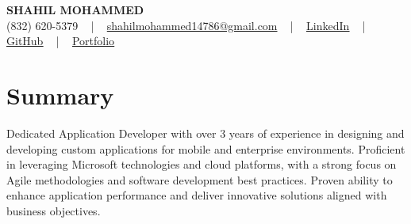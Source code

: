\documentclass[letterpaper,10pt]{article}
\begin{document}
\begin{center}
    {\fontsize{14pt}{12pt}\selectfont \textbf{\MakeUppercase{Shahil Mohammed}}}\\ \vspace{2pt}
    \fontsize{10pt}{12pt}\selectfont (832) 620-5379 ~ | ~ \href{mailto:shahilmohammed14786@gmail.com}{shahilmohammed14786@gmail.com} ~ | ~  
    \href{https://www.linkedin.com/in/shahil-mohammed-9652931a1/}{\color{blue}\underline{LinkedIn}}  ~ | ~ 
    \href{https://github.com/freakbeast14}{\color{blue}\underline{GitHub}} ~ | ~ 
    \href{https://shahil-mohammed.netlify.app/}{\color{blue}\underline{Portfolio}}
    \vspace{-8pt}
\end{center}

\section{Summary}
\vspace{-2pt}\fontsize{8pt}{9pt}\selectfont
Dedicated Application Developer with over 3 years of experience in designing and developing custom applications for mobile and enterprise environments. Proficient in leveraging Microsoft technologies and cloud platforms, with a strong focus on Agile methodologies and software development best practices. Proven ability to enhance application performance and deliver innovative solutions aligned with business objectives.
\vspace{-5pt}
 
\vspace{-2pt}
\end{document}

